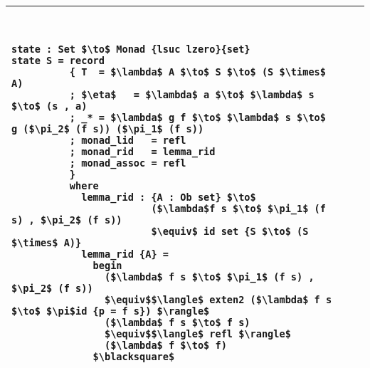 \documentclass[../main.tex]{subfiles}
\begin{document}
\begin{tabular}{lll}
\toprule
{\tt
\begin{lstlisting}[mathescape]
state : Set $\to$ Monad {lsuc lzero}{set}
state S = record
          { T  = $\lambda$ A $\to$ S $\to$ (S $\times$ A)
          ; $\eta$   = $\lambda$ a $\to$ $\lambda$ s $\to$ (s , a)
          ; _* = $\lambda$ g f $\to$ $\lambda$ s $\to$ g ($\pi_2$ (f s)) ($\pi_1$ (f s))
          ; monad_lid   = refl
          ; monad_rid   = lemma_rid
          ; monad_assoc = refl
          }
          where
            lemma_rid : {A : Ob set} $\to$
                        ($\lambda$f s $\to$ $\pi_1$ (f s) , $\pi_2$ (f s))
                        $\equiv$ id set {S $\to$ (S $\times$ A)}
            lemma_rid {A} =
              begin
                ($\lambda$ f s $\to$ $\pi_1$ (f s) , $\pi_2$ (f s))
                $\equiv$$\langle$ exten2 ($\lambda$ f s $\to$ $\pi$id {p = f s}) $\rangle$
                ($\lambda$ f s $\to$ f s)
                $\equiv$$\langle$ refl $\rangle$
                ($\lambda$ f $\to$ f)
              $\blacksquare$
\end{lstlisting}
}
\\
\bottomrule
\end{tabular}
\end{document}

